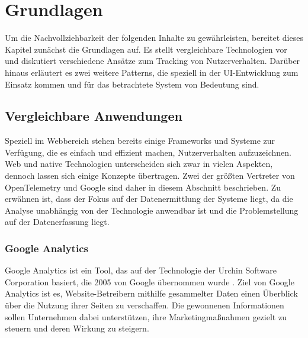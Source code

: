 \chapter{Grundlagen}
\label{cha:grundlagen}
Um die Nachvollziehbarkeit der folgenden Inhalte zu gewährleisten, bereitet dieses Kapitel zunächst die Grundlagen auf. Es stellt vergleichbare Technologien vor und diskutiert verschiedene Ansätze zum Tracking von Nutzerverhalten. Darüber hinaus erläutert es zwei weitere Patterns, die speziell in der UI-Entwicklung zum Einsatz kommen und für das betrachtete System von Bedeutung sind.

\section{Vergleichbare Anwendungen}
\label{sec:similar_applications}
Speziell im Webbereich stehen bereits einige Frameworks und Systeme zur Verfügung, die es einfach und effizient machen, Nutzerverhalten aufzuzeichnen. Web und native Technologien unterscheiden sich zwar in vielen Aspekten, dennoch lassen sich einige Konzepte übertragen. Zwei der größten Vertreter von OpenTelemetry und Google sind daher in diesem Abschnitt beschrieben. Zu erwähnen ist, dass der Fokus auf der Datenermittlung der Systeme liegt, da die Analyse unabhängig von der Technologie anwendbar ist und die Problemstellung auf der Datenerfassung liegt.

\subsection{Google Analytics}
\label{subsec:google_analytics}

Google Analytics ist ein Tool, das auf der Technologie der Urchin Software Corporation basiert, die 2005 von Google übernommen wurde \cite{google2005urchin}. Ziel von Google Analytics ist es, Website-Betreibern mithilfe gesammelter Daten einen Überblick über die Nutzung ihrer Seiten zu verschaffen. Die gewonnenen Informationen sollen Unternehmen dabei unterstützen, ihre Marketingmaßnahmen gezielt zu steuern und deren Wirkung zu steigern.

